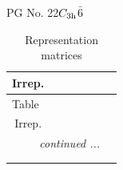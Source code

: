 \documentclass[fleqn,8pt,landscape]{jsarticle}
\begin{document}
\setcounter{MaxMatrixCols}{32}

\renewcommand{\tablename}{Table~}
\renewcommand{\figurename}{Figure~}
\begin{center}
\LARGE
PG No. 22\quad$C_{\rm 3h}$\quad$\bar{6}$\quad[ hexagonal ]
\end{center}
\renewcommand{\arraystretch}{1.2}
\begin{longtable}{ccccccc}
\caption{Representation matrices}
 \\
 \hline \hline
Irrep. &  &  &  &  &  &  \\ \hline \endfirsthead

\multicolumn{6}{l}{\tablename\ \thetable{}} \\
 \hline \hline
Irrep. &  &  &  &  &  &  \\ \hline \endhead

 \hline \hline
\multicolumn{6}{r}{\footnotesize\it continued ...} \\ \endfoot

 \hline \hline
\multicolumn{6}{r}{} \\ \endlastfoot


\end{longtable}
\end{document}
